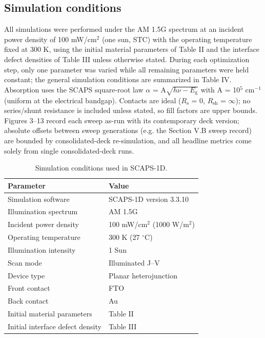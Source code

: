 \documentclass[review]{elsarticle}
\begin{document}
\subsection{Simulation conditions}
All simulations were performed under the AM 1.5G spectrum at an incident power density of 100 mW/cm$^{2}$ (one sun, STC) with the operating temperature fixed at 300 K, using the initial material parameters of Table II and the interface defect densities of Table III unless otherwise stated. During each optimization step, only one parameter was varied while all remaining parameters were held constant; the general simulation conditions are summarized in Table IV. Absorption uses the SCAPS square-root law $\alpha$ = A$\sqrt{h\nu-E_{\mathrm{g}}}$ with A = 10$^{5}$ cm$^{-1}$ (uniform at the electrical bandgap). Contacts are ideal ($R_{\mathrm{s}}$ = 0, $R_{\mathrm{sh}}$ = $\infty$); no series/shunt resistance is included unless stated, so fill factors are upper bounds. Figures 3--13 record each sweep as-run with its contemporary deck version; absolute offsets between sweep generations (e.g. the Section V.B sweep record) are bounded by consolidated-deck re-simulation, and all headline metrics come solely from single consolidated-deck runs.

\begin{table}[htbp]
\centering
{\small\setlength{\tabcolsep}{3pt}
\begin{tabularx}{\textwidth}{XX}
\hline
Parameter & Value
\\\hline
Simulation software & SCAPS-1D version 3.3.10\\
Illumination spectrum & AM 1.5G\\
Incident power density & 100 mW/cm$^{2}$ (1000 W/m$^{2}$)\\
Operating temperature & 300 K (27 $^{\circ}$C)\\
Illumination intensity & 1 Sun\\
Scan mode & Illuminated J--V\\
Device type & Planar heterojunction\\
Front contact & FTO\\
Back contact & Au\\
Initial material parameters & Table II\\
Initial interface defect density & Table III\\
\hline
\end{tabularx}
}
\caption{Simulation conditions used in SCAPS-1D.}
\end{table}
\end{document}
